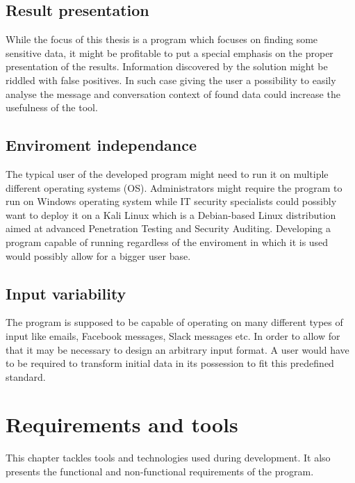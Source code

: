 \documentclass[a4paper,twoside,12pt]{book}
\begin{document}
\section{Result presentation}

While the focus of this thesis is a program which focuses on finding some sensitive data, it might be profitable to put a special emphasis on the proper
presentation of the results. Information discovered by the solution might be riddled with false positives. In such case giving the user a possibility
to easily analyse the message and conversation context of found data could increase the usefulness of the tool. 

\section{Enviroment independance}

The typical user of the developed program might need to run it on multiple different operating systems (OS). Administrators might require the program to run
on Windows operating system while IT security specialists could possibly want to deploy it on a Kali Linux which is a Debian-based Linux distribution 
aimed at advanced Penetration Testing and Security Auditing. Developing a program capable of running regardless of the enviroment in which it is used would possibly
allow for a bigger user base.

\section{Input variability}

The program is supposed to be capable of operating on many different types of input like emails, Facebook messages, Slack messages etc. In order to 
allow for that it may be necessary to design an arbitrary input format. A user would have to be required to transform initial data in its possession to 
fit this predefined standard. 

\chapter{Requirements and tools}

This chapter tackles tools and technologies used during development. It also presents the functional and non-functional requirements of the program.
\end{document}
